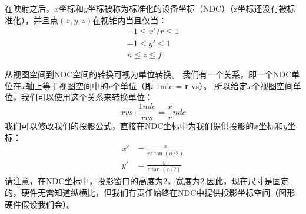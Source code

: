 \documentclass[11pt,a4paper,oldfontcommands]{memoir}
\begin{document}
{\begin{flushleft}
在映射之后，$x$坐标和$y$坐标被称为标准化的设备坐标（NDC）（z坐标还没有被标准化），并且点$(x,y,z)$在视锥内当且仅当：
\begin{align*}
-1\leq x'/r \leq 1 \\
-1\leq y' \leq 1 \\
n \leq z \leq f
\end{align*}

从视图空间到NDC空间的转换可视为单位转换。 我们有一个关系，即一个NDC单位在$x$轴上等于视图空间中的$r$个单位（即 1ndc = \textbf{r} vs）。 所以给定$x$个视图空间单位，我们可以使用这个关系来转换单位：
$$x\mathit{vs}\cdot \frac{1\mathit{ndc}}{r\mathit{vs}}=\frac{x}{r}\mathit{ndc}$$
我们可以修改我们的投影公式，直接在NDC坐标中为我们提供投影的$x$坐标和$y$坐标：
\begin{align*}\tag{eq.5.1}\label{eq.5.1}
x'&=\frac{x}{rz\tan(\alpha/2)}\\
y'&=\frac{y}{z\tan(\alpha/2)}
\end{align*}
请注意，在NDC坐标中，投影窗口的高度为2，宽度为2.因此，现在尺寸是固定的，硬件无需知道纵横比，但我们有责任始终在NDC中提供投影坐标空间（图形硬件假设我们会）。
\end{flushleft}

}
\end{document}
